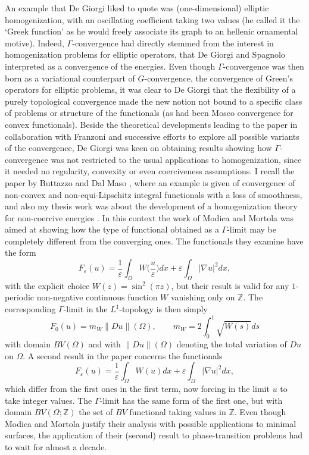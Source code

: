 \documentclass{article}
\newcommand{\e}{\varepsilon}
\begin{document}
An example that De Giorgi liked to quote was (one-dimensional) elliptic homogenization, with an oscillating coefficient taking two values (he called it the `Greek function' as he would freely associate its graph to an hellenic ornamental motive). Indeed, $\Gamma$-convergence had directly stemmed from the interest in homogenization problems for elliptic operators, that De Giorgi and Spagnolo interpreted as a convergence of the energies. Even though $\Gamma$-convergence was then born as a variational counterpart of $G$-convergence, the convergence of Green's operators for elliptic problems, it was clear to De Giorgi that the flexibility of a purely topological convergence made the new notion not bound to a specific class of problems or structure of the functionals (as had been Mosco convergence for convex functionals). Beside the theoretical developments leading to the paper in collaboration with Franzoni and successive efforts to explore all possible variants of the convergence, De Giorgi was keen on obtaining results showing how $\Gamma$-convergence was not restricted to the usual applications to homogenization, since it needed no regularity, convexity or even coerciveness assumptions. I recall the paper by Buttazzo and Dal Maso \cite{MR527419}, where an example is given of convergence of non-convex and non-equi-Lipschitz integral functionals with a loss of smoothness, and also my thesis work was about the development of a homogenization theory for non-coercive energies \cite{MR766686}. In this context the work of Modica and Mortola \cite{MM} was aimed at showing how the type of functional obtained as a $\Gamma$-limit may be completely different from the converging ones. The 
functionals they examine have the form
\begin{equation}
F_\e(u)=\frac1\e\int_\Omega W\Big(\frac u\e\Big)dx+ \e \int_\Omega|\nabla u|^2dx,
\end{equation}
with the explicit choice $W(z)=\sin^2(\pi z)$, but their result is valid for any $1$-periodic non-negative continuous function $W$ vanishing only on $\mathbb Z$. The corresponding $\Gamma$-limit in the $L^1$-topology is then simply
\begin{equation}\label{2}
F_0(u)=m_W\|Du\|(\Omega),\qquad m_W=2\int_0^1\sqrt{W(s)}ds
\end{equation}
with domain $BV(\Omega)$ and with $\|Du\|(\Omega)$ denoting the total variation of $Du$ on $\Omega$. A second result in the paper concerns the functionals 
\begin{equation}\label{3}
F_\e(u)=\frac1\e\int_\Omega W(u)dx+ \e \int_\Omega|\nabla u|^2dx,
\end{equation}
which differ from the first ones in the first term, now forcing in the limit $u$ to take integer values.
The $\Gamma$-limit has the same form of the first one, but with domain $BV(\Omega;\mathbb Z)$ 
the set of $BV$ functional taking values in $\mathbb Z$. 
Even though Modica and Mortola justify their analysis with possible applications to minimal surfaces, the application of their (second) result to phase-transition problems had to wait for almost a decade.
\end{document}
